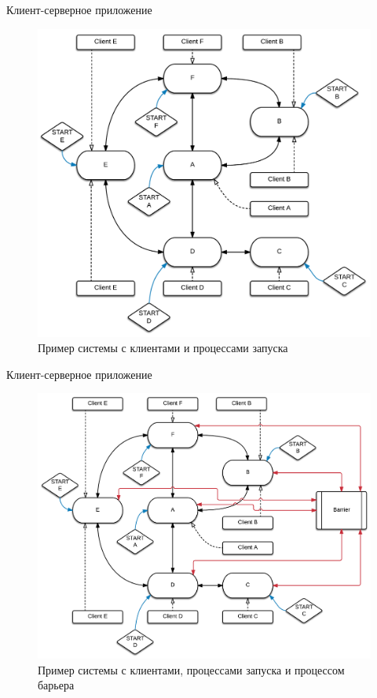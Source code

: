 \documentclass{beamer}
\begin{document}
\begin{frame}[fragile]{Клиент-серверное приложение}
	\begin{figure}
		\includegraphics[scale=0.11]{img/start.png}
		\caption{Пример системы с клиентами и процессами запуска}
	\end{figure}
\end{frame}

\begin{frame}[fragile]{Клиент-серверное приложение}
	\begin{figure}
		\includegraphics[scale=0.11]{img/bar.png}
		\caption{Пример системы с клиентами, процессами запуска и процессом барьера}
	\end{figure}
\end{frame}
\end{document}
